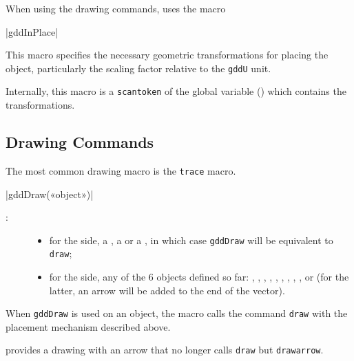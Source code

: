 \documentclass[a4paper,english]{article}
\begin{document}
When using the drawing commands, \mpgeomdd uses the macro\label{gddEnPlace}
\begin{colourband}
\macro|gddInPlace|
\end{colourband}
This macro specifies the necessary geometric transformations for placing the object, particularly the scaling factor relative to the \lstinline+gddU+ unit.

Internally, this macro is a \lstinline+scantoken+ of the global variable  () which contains the transformations.

\subsection{Drawing Commands}\label{sec:trace}

The most common drawing macro is the \lstinline+trace+ macro.
\begin{colourband}
\macro|gddDraw(«object»)|
\begin{description}
  \item[:] 
  \begin{itemize}
    \item for the \MP{} side, a , a
   or a , in which case \lstinline+gddDraw+ will be
  equivalent to \lstinline+draw+;
    \item for the \mpgeomdd side,
  any of the 6 objects defined so far: ,
  , , , ,
  , ,
  , ,
   or  (for the latter, an arrow will be
  added to the end of the vector).
  \end{itemize}
\end{description}
\end{colourband}

When \lstinline+gddDraw+ is used on an \mpgeomdd object, the macro calls the \MP{} command \lstinline+draw+ with the placement mechanism described above.

\mpgeomdd provides a drawing with an arrow that no longer calls \lstinline+draw+
but \lstinline+drawarrow+.
\end{document}
